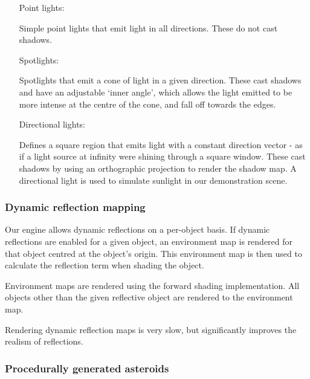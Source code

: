 \documentclass[11pt]{scrartcl} %
\begin{document}
            \begin{itemize}

            \item[Point lights:]

                Simple point lights that emit light in all directions. These do
                not cast shadows.

            \item[Spotlights:]

                Spotlights that emit a cone of light in a given direction.
                These cast shadows and have an adjustable `inner angle', which
                allows the light emitted to be more intense at the centre of
                the cone, and fall off towards the edges.

            \item[Directional lights:]

                Defines a square region that emits light with a constant
                direction vector - as if a light source at infinity were
                shining through a square window. These cast shadows by using an
                orthographic projection to render the shadow map. A directional
                light is used to simulate sunlight in our demonstration scene.

            \end{itemize}

        \subsubsection{Dynamic reflection mapping}

            Our engine allows dynamic reflections on a per-object basis. If
            dynamic reflections are enabled for a given object, an environment
            map is rendered for that object centred at the object's origin.
            This environment map is then used to calculate the reflection term
            when shading the object.

            Environment maps are rendered using the forward shading
            implementation. All objects other than the given reflective object
            are rendered to the environment map.

            Rendering dynamic reflection maps is very slow, but significantly
            improves the realism of reflections.

        \subsubsection{Procedurally generated asteroids}
\end{document}
